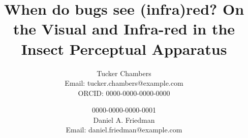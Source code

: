 \usepackage[colorlinks=true,linkcolor=blue,citecolor=blue,urlcolor=blue]{hyperref}
\usepackage[nameinlink,capitalise]{cleveref}

\usepackage{amsthm}
\newtheorem{theorem}{Theorem}[section]
\newtheorem{lemma}[theorem]{Lemma}
\newtheorem{proposition}[theorem]{Proposition}
\newtheorem{corollary}[theorem]{Corollary}
\newtheorem{definition}[theorem]{Definition}
\newtheorem{example}[theorem]{Example}
\newtheorem{remark}[theorem]{Remark}

\usepackage{titlesec}
\titlespacing{\section}{0pt}{12pt}{6pt}
\titlespacing{\subsection}{0pt}{10pt}{4pt}
\titlespacing{\subsubsection}{0pt}{8pt}{3pt}

\titleformat{\section}{\large\bfseries}{\thesection}{1em}{}
\titleformat{\subsection}{\normalsize\bfseries}{\thesubsection}{1em}{}
\titleformat{\subsubsection}{\normalsize\itshape}{\thesubsubsection}{1em}{}

\title{When do bugs see (infra)red? On the Visual and Infra-red in the Insect Perceptual Apparatus}
\author{Tucker Chambers \\
\small Email: tucker.chambers@example.com \\
\small ORCID: 0000-0000-0000-0000 \and 0000-0000-0000-0001 \\
Daniel A. Friedman \\
\small Email: daniel.friedman@example.com}
